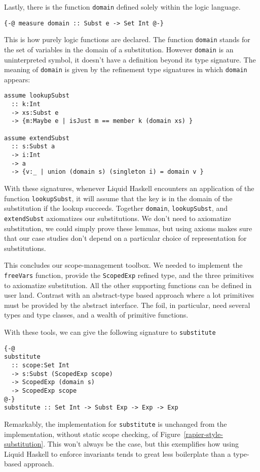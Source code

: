 \documentclass[sigconf, anonymous, review]{acmart}
\newcommand{\tc}[1]{{\small\texttt{#1}}}
\begin{document}
Lastly, there is the function \tc{domain} defined solely within the logic
language.

\begin{verbatim}
{-@ measure domain :: Subst e -> Set Int @-}
\end{verbatim}

This is how purely logic functions are declared. The function \tc{domain} stands
for the set of variables in the domain of a substitution. However \tc{domain} is
an uninterpreted symbol, it doesn't have a definition beyond its type signature.
The meaning of \tc{domain} is given by the refinement type signatures in which
\tc{domain} appears:

\begin{verbatim}
assume lookupSubst
  :: k:Int
  -> xs:Subst e
  -> {m:Maybe e | isJust m == member k (domain xs) }

assume extendSubst
  :: s:Subst a
  -> i:Int
  -> a
  -> {v:_ | union (domain s) (singleton i) = domain v }
\end{verbatim}

With these signatures, whenever Liquid Haskell encounters an application of the
function \tc{lookupSubst}, it will assume that the key is in the domain of the
substitution if the lookup succeeds. Together \tc{domain}, \tc{lookupSubst}, and
\tc{extendSubst} axiomatizes our substitutions. We don't need to axiomatize
substitution, we could simply prove these lemmas, but using axioms makes sure
that our case studies don't depend on a particular choice of representation for
substitutions.

This concludes our scope-management toolbox. We needed to implement the
\tc{freeVars} function, provide the \tc{ScopedExp} refined type, and the three
primitives to axiomatize substitution. All the other supporting functions can be
defined in user land. Contrast with an abstract-type based approach where a lot
primitives must be provided by the abstract interface. The foil, in particular,
need several types and type classes, and a wealth of primitive functions.

With these tools, we can give the following signature to \tc{substitute}
\begin{verbatim}
{-@
substitute
  :: scope:Set Int
  -> s:Subst (ScopedExp scope)
  -> ScopedExp (domain s)
  -> ScopedExp scope
@-}
substitute :: Set Int -> Subst Exp -> Exp -> Exp
\end{verbatim}
Remarkably, the implementation for \tc{substitute} is unchanged from the
implementation, without static scope checking, of
Figure~\ref{rapier-style-substitution}. This won't always be the case, but this
exemplifies how using Liquid Haskell to enforce invariants tends to great less
boilerplate than a type-based approach.
\end{document}
